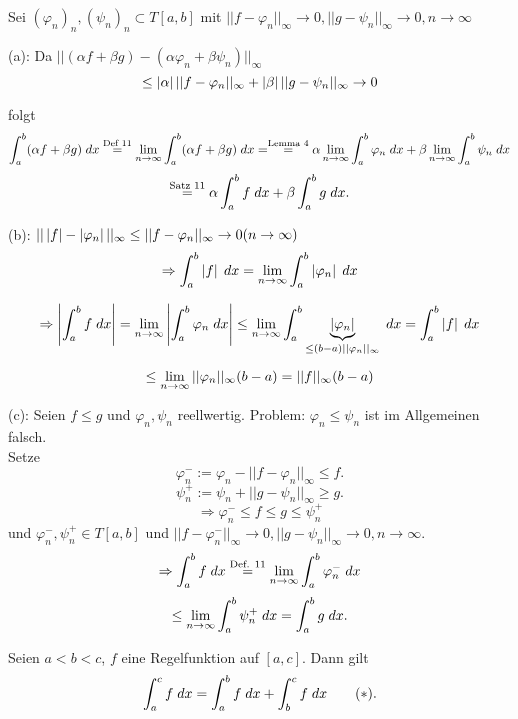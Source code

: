 \documentclass[../ana2.tex]{subfiles}
\begin{document}
\begin{bew}
    Sei \((\varphi_n)_n, (\psi_n)_n \subset T[a,b] \) mit 
    \( ||f-\varphi_n||_\infty \rightarrow 0, 
    ||g-\psi_n||_\infty \rightarrow 0, n \rightarrow \infty \)
    
    (a): Da \( ||(\alpha f+\beta g) - (\alpha \varphi_n + \beta \psi_n) ||_\infty \)
    \[ \leq \abs{\alpha} ||f - \varphi_n||_\infty 
    + \abs{\beta} ||g - \psi_n||_\infty \rightarrow 0 \]
    
    folgt 
    \[ \integral{(\alpha f + \beta g)}{a}{b} \oversett{Def 11}{=}
    \limes{n} \integral{(\alpha f + \beta g)}{a}{b}
    = \oversett{Lemma 4}{=} \alpha \limes{n} \integral{\varphi_n}{a}{b}
    + \beta \limes{n} \integral{\psi_n}{a}{b} \]
    \[ \oversett{Satz 11}{=} \alpha \integral{f}{a}{b} 
    + \beta \integral{g}{a}{b}. \]

    (b): \( || \abs{f} - \abs{\varphi_n}||_\infty \leq ||f-\varphi_n||_\infty
    \rightarrow 0 (n \rightarrow \infty) \)
    \[ \Rightarrow \integral{\abs{f}}{a}{b}
    = \limes{n} \integral{\abs{\varphi_n}}{a}{b} \]

    \[ \Rightarrow \abs{\integral{f}{a}{b}} = \limes{n} \abs{\integral{\varphi_n}{a}{b}}
    \leq \limes{n} 
    \integral{\underbrace{\abs{\varphi_n}}_{\leq (b-a)||\varphi_n||_\infty}}{a}{b} 
    = \integral{\abs{f}}{a}{b} \]
    
    \[ \leq \limes{n} ||\varphi_n||_\infty (b-a)  
    = ||f||_\infty (b-a) \]
    
    (c): Seien \( f \leq g \) und \( \varphi_n, \psi_n \) reellwertig.
    Problem: \( \varphi_n \leq \psi_n \) ist im Allgemeinen falsch.\\
    Setze \[ \varphi_n^- 
    := \varphi_n - ||f - \varphi_n||_\infty 
    \leq f. \]
    \[ \psi_n^+ := \psi_n + ||g - \psi_n||_\infty \geq g. \]
    \[ \Rightarrow \varphi_n^- \leq f \leq g \leq \psi_n^+ \]
    und \( \varphi_n^-, \psi_n^+ \in T[a,b] \)
    und \( ||f - \varphi_n^-||_\infty \rightarrow 0, 
    ||g - \psi_n||_\infty \rightarrow 0, n\rightarrow \infty \).
    \[ \Rightarrow \integral{f}{a}{b}
    \oversett{Def. 11}{=} \limes{n} 
    \integral{\varphi_n^-}{a}{b} \]
    \[ \leq \limes{n} \integral{\psi_n^+}{a}{b} 
    = \integral{g}{a}{b}. \]
\end{bew}
\begin{satz}
    Seien \( a < b < c \), \(f\) eine Regelfunktion auf 
    \( [a,c] \). Dann gilt 
    \[ \integral{f}{a}{c} 
    = \integral{f}{a}{b} + \integral{f}{b}{c} \tag{\(*\)}. \]
\end{satz}
\end{document}
